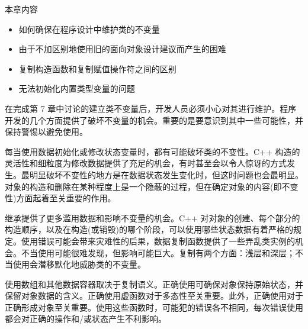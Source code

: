 本章内容

\begin{itemize}
\item
如何确保在程序设计中维护类的不变量

\item
由于不加区别地使用旧的面向对象设计建议而产生的困难

\item
复制构造函数和复制赋值操作符之间的区别

\item
无法初始化内置类型变量的问题
\end{itemize}

在完成第 7 章中讨论的建立类不变量后，开发人员必须小心对其进行维护。程序开发的几个方面提供了破坏不变量的机会。重要的是要意识到其中一些可能性，并保持警惕以避免使用。

每当使用数据初始化或修改状态变量时，都有可能破坏类的不变性。C++ 构造的灵活性和细粒度为修改数据提供了充足的机会，有时甚至会以令人惊讶的方式发生。最明显破坏不变性的地方是在数据状态发生变化时，但这时问题也会最明显。对象的构造和删除在某种程度上是一个隐蔽的过程，但在确定对象的内容(即不变性)方面起着至关重要的作用。

继承提供了更多滥用数据和影响不变量的机会。C++ 对对象的创建、每个部分的构造顺序，以及在构造(或销毁)的哪个阶段，可以使用哪些状态数据有着严格的规定。使用错误可能会带来灾难性的后果，数据复制函数提供了一些弄乱类实例的机会。不当使用可能很难发现，但影响可能巨大。复制有两个方面：浅层和深层；不当使用会潜移默化地威胁类的不变量。

使用数组和其他数据容器取决于复制语义。正确使用可确保对象保持原始状态，并保留对象数据的含义。正确使用虚函数对于多态性至关重要。此外，正确使用对于正确形成对象至关重要。使用这些函数时，可能犯的错误各不相同，每次错误使用都会对正确的操作和/或状态产生不利影响。
